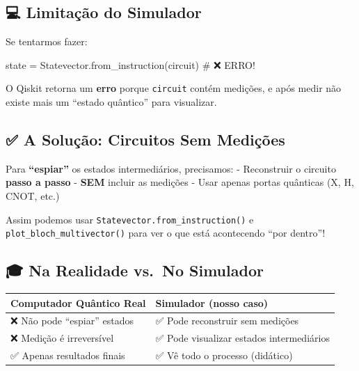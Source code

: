 \documentclass[
  brazilian,
]{report}
\newenvironment{Shaded}{\begin{snugshade}}{\end{snugshade}}
\newcommand{\CommentTok}[1]{\textcolor[rgb]{0.37,0.37,0.37}{#1}}
\newcommand{\NormalTok}[1]{\textcolor[rgb]{0.00,0.23,0.31}{#1}}
\newcommand{\OperatorTok}[1]{\textcolor[rgb]{0.37,0.37,0.37}{#1}}
\newcounter{none} %
\begin{document}
\subsection{💻 Limitação do
Simulador}\label{limitauxe7uxe3o-do-simulador}

Se tentarmos fazer:

\begin{Shaded}
\begin{Highlighting}[]
\NormalTok{state }\OperatorTok{=}\NormalTok{ Statevector.from\_instruction(circuit)  }\CommentTok{\# ❌ ERRO!}
\end{Highlighting}
\end{Shaded}

O Qiskit retorna um \textbf{erro} porque \texttt{circuit} contém
medições, e após medir não existe mais um ``estado quântico'' para
visualizar.

\subsection{✅ A Solução: Circuitos Sem
Medições}\label{a-soluuxe7uxe3o-circuitos-sem-mediuxe7uxf5es}

Para \textbf{``espiar''} os estados intermediários, precisamos: -
Reconstruir o circuito \textbf{passo a passo} - \textbf{SEM} incluir as
medições - Usar apenas portas quânticas (X, H, CNOT, etc.)

Assim podemos usar \texttt{Statevector.from\_instruction()} e
\texttt{plot\_bloch\_multivector()} para ver o que está acontecendo
``por dentro''!

\subsection{🎓 Na Realidade vs.~No
Simulador}\label{na-realidade-vs.-no-simulador}

{\def\LTcaptype{none} %
\begin{longtable}[]{@{}
  >{\raggedright\arraybackslash}p{}
  >{\raggedright\arraybackslash}p{}@{}}
\toprule\noalign{}
\begin{minipage}[b]{\linewidth}\raggedright
Computador Quântico Real
\end{minipage} & \begin{minipage}[b]{\linewidth}\raggedright
Simulador (nosso caso)
\end{minipage} \\
\midrule\noalign{}
\endhead
\bottomrule\noalign{}
\endlastfoot
❌ Não pode ``espiar'' estados & ✅ Pode reconstruir sem medições \\
❌ Medição é irreversível & ✅ Pode visualizar estados intermediários \\
✅ Apenas resultados finais & ✅ Vê todo o processo (didático) \\
\end{longtable}
}
\end{document}

